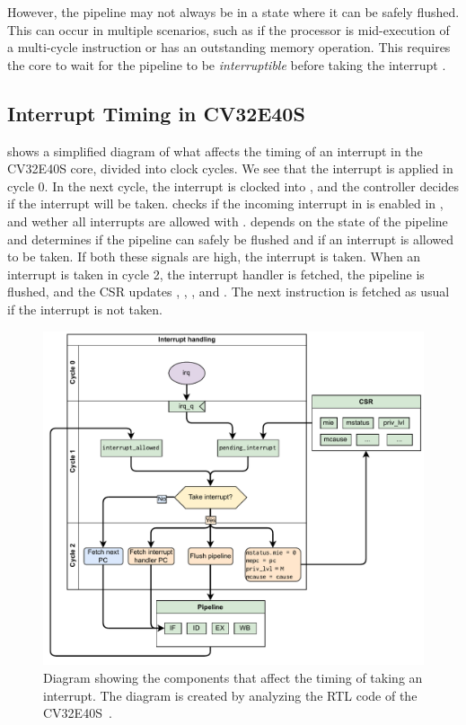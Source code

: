However, the pipeline may not always be in a state where it can be safely flushed. This can occur in multiple scenarios, such as if the processor is mid-execution of a multi-cycle instruction or has an outstanding memory operation. This requires the core to wait for the pipeline to be \textit{interruptible} before taking the interrupt \cite{taylorAdvancedRISCVVerification2023}.





\subsection{Interrupt Timing in CV32E40S}

 shows a simplified diagram of what affects the timing of an interrupt in the CV32E40S core, divided into clock cycles. We see that the interrupt is applied in cycle 0. In the next cycle, the interrupt is clocked into , and the controller decides if the interrupt will be taken.  checks if the incoming interrupt in  is enabled in , and wether all interrupts are allowed with .  depends on the state of the pipeline and determines if the pipeline can safely be flushed and if an interrupt is allowed to be taken. 
If both these signals are high, the interrupt is taken. When an interrupt is taken in cycle 2, the interrupt handler is fetched, the pipeline is flushed, and the CSR updates , , , and . The next instruction is fetched as usual if the interrupt is not taken.


\begin{figure}
    \centering
    \includegraphics[width=1\linewidth]{figures/interrupt_handeling_timing.pdf}
    \caption{Diagram showing the components that affect the timing of taking an interrupt. The diagram is created by analyzing the RTL code of the CV32E40S~\cite{openhwgroupCv32e40s2024}.}
    \label{fig:interrupt_timing}
\end{figure}






